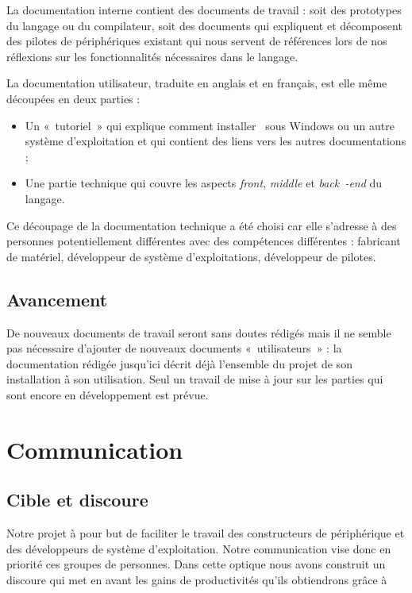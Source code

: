 \documentclass[francais]{rtxreport}
\begin{document}
La documentation interne contient des documents de travail : soit des prototypes
du langage ou du compilateur, soit des documents qui expliquent et décomposent
des pilotes de périphériques existant qui nous servent de références lors de nos
réflexions sur les fonctionnalités nécessaires dans le langage.

La documentation utilisateur, traduite en anglais et en français, est elle même
découpées en deux parties :
\begin{itemize}
\item Un «~tutoriel~» qui explique comment installer \rtx\ sous Windows ou un
  autre système d'exploitation et qui contient des liens vers les autres
  documentations ;
\item Une partie technique qui couvre les aspects \emph{front}, \emph{middle} et
  \emph{back~-end} du langage.
\end{itemize}
Ce découpage de la documentation technique a été choisi car elle s'adresse à des
personnes potentiellement différentes avec des compétences différentes :
fabricant de matériel, développeur de système d'exploitations, développeur de
pilotes.

\section{Avancement}

De nouveaux documents de travail seront sans doutes rédigés mais il ne semble
pas nécessaire d'ajouter de nouveaux documents «~utilisateurs~» : la
documentation rédigée jusqu'ici décrit déjà l'ensemble du projet de son
installation à son utilisation. Seul un travail de mise à jour sur les parties
qui sont encore en développement est prévue.

\chapter{Communication}



\section{Cible et discoure}


Notre projet à pour but de faciliter le travail des constructeurs de
périphérique et des développeurs de système d'exploitation. Notre
communication vise donc en priorité ces groupes de personnes. Dans cette
optique nous avons construit un discoure qui met en avant les gains de
productivités qu'ils obtiendrons grâce à \rtx\
\end{document}
